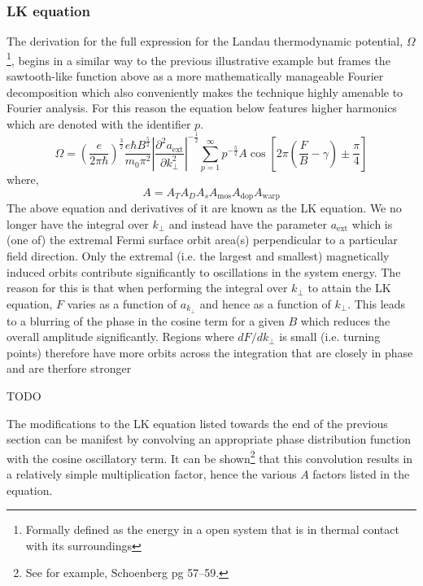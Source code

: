 \subsubsection{\acl{LK} equation}

The derivation for the full expression for the Landau thermodynamic potential, $\Omega$\footnote{Formally defined as the energy in a open system that is in thermal contact with its surroundings}, begins in a similar way to the previous illustrative example but frames the sawtooth-like function above as a more mathematically manageable Fourier decomposition which also conveniently makes the technique highly amenable to Fourier analysis. For this reason the equation below features higher harmonics which are denoted with the identifier $p$.
\begin{equation}
\Omega = \left(\frac{e}{2\pi\hbar}\right)^{\frac{3}{2}}\frac{e\hbar B^{\frac{5}{2}}}{m_0 \pi^2}\left| \frac{\partial^2 a_{\textrm{ext}}}{\partial k^2_\perp}\right|^{-\frac{1}{2}}\sum_{p=1}^{\infty}p^{-\frac{5}{2}}A\cos\left[2\pi\left(\frac{F}{B} - \gamma\right)\pm\frac{\pi}{4}\right]
\end{equation}
where,
\begin{equation}
A = A_T A_D A_s A_{\textrm{mos}} A_{\textrm{dop}} A_{\textrm{warp}} 
\end{equation}
The above equation and derivatives of it are known as the \ac{LK} equation. We no longer have the integral over $k_\perp$ and instead have the parameter $a_{\textrm{ext}}$ which is (one of) the extremal Fermi surface orbit area(s) perpendicular to a particular field direction. Only the extremal (i.e. the largest and smallest) magnetically induced orbits contribute significantly to oscillations in the system energy. The reason for this is that when performing the integral over $k_\perp$ to attain the \ac{LK} equation, $F$ varies as a function of $a_{k_\perp}$ and hence as a function of $k_\perp$. This leads to a blurring of the phase in the cosine term for a given $B$ which reduces the overall amplitude significantly. Regions where $dF/dk_\perp$ is small (i.e. turning points) therefore have more orbits across the integration that are closely in phase and are therfore stronger

TODO

The modifications to the \ac{LK} equation listed towards the end of the previous section can be manifest by convolving an appropriate phase distribution function with the cosine oscillatory term. It can be shown\footnote{See for example, Schoenberg pg 57--59.\cite{Schoenberg1984}} that this convolution results in a relatively simple multiplication factor, hence the various $A$ factors listed in the equation.


